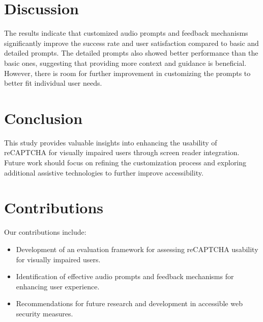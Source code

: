 \documentclass{article}
\begin{document}
\section{Discussion}
The results indicate that customized audio prompts and feedback mechanisms significantly improve the success rate and user satisfaction compared to basic and detailed prompts. The detailed prompts also showed better performance than the basic ones, suggesting that providing more context and guidance is beneficial. However, there is room for further improvement in customizing the prompts to better fit individual user needs.

\section{Conclusion}
This study provides valuable insights into enhancing the usability of reCAPTCHA for visually impaired users through screen reader integration. Future work should focus on refining the customization process and exploring additional assistive technologies to further improve accessibility.

\section{Contributions}
Our contributions include:
\begin{itemize}
    \item Development of an evaluation framework for assessing reCAPTCHA usability for visually impaired users.
    \item Identification of effective audio prompts and feedback mechanisms for enhancing user experience.
    \item Recommendations for future research and development in accessible web security measures.
\end{itemize}



\end{document}
